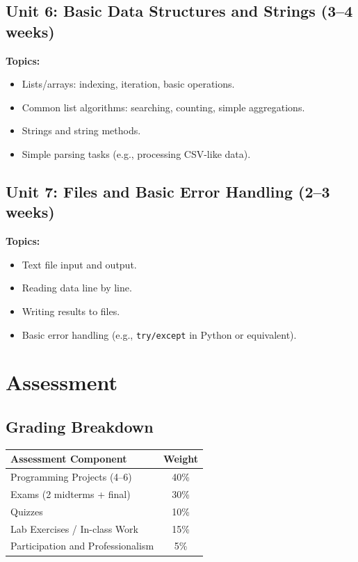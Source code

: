 \documentclass[12pt,oneside]{book}
\begin{document}
\subsection{Unit 6: Basic Data Structures and Strings (3--4 weeks)}

\textbf{Topics:}
\begin{itemize}
    \item Lists/arrays: indexing, iteration, basic operations.
    \item Common list algorithms: searching, counting, simple aggregations.
    \item Strings and string methods.
    \item Simple parsing tasks (e.g., processing CSV-like data).
\end{itemize}

\subsection{Unit 7: Files and Basic Error Handling (2--3 weeks)}

\textbf{Topics:}
\begin{itemize}
    \item Text file input and output.
    \item Reading data line by line.
    \item Writing results to files.
    \item Basic error handling (e.g., \texttt{try/except} in Python or equivalent).
\end{itemize}

\section{Assessment}

\subsection{Grading Breakdown}

\begin{table}[h]
\centering
\begin{tabular}{lc}
\toprule
\textbf{Assessment Component} & \textbf{Weight} \\
\midrule
Programming Projects (4--6) & 40\% \\
Exams (2 midterms + final) & 30\% \\
Quizzes & 10\% \\
Lab Exercises / In-class Work & 15\% \\
Participation and Professionalism & 5\% \\
\bottomrule
\end{tabular}
\end{table}
\end{document}
